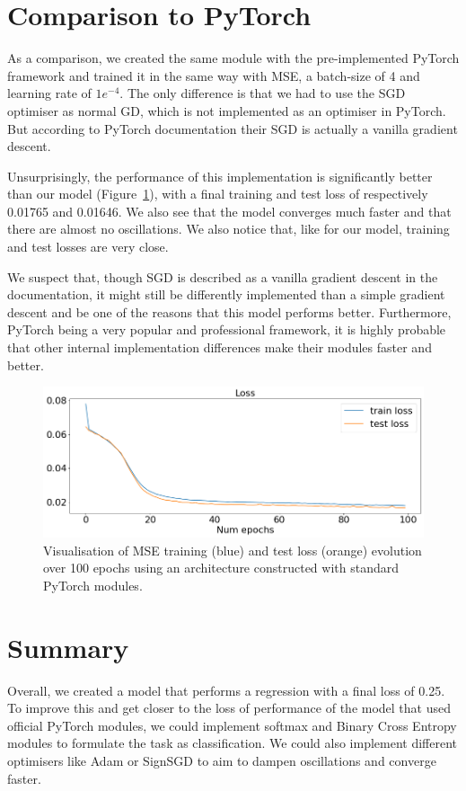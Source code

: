 \documentclass[10pt,conference,compsocconf]{IEEEtran}
\begin{document}
\section{Comparison to PyTorch}
As a comparison, we created the same module with the pre-implemented PyTorch framework and trained it in the same way with MSE, a batch-size of 4 and learning rate of $1e^{-4}$. The only difference is that we had to use the SGD optimiser as normal GD, which is not implemented as an optimiser in PyTorch. But according to PyTorch documentation their SGD is actually a vanilla gradient descent. 

Unsurprisingly, the performance of this implementation is significantly better than our model (Figure~\ref{fig:model-pytorch}), with a final training and test loss of respectively 0.01765 and 0.01646. We also see that the model converges much faster and that there are almost no oscillations. We also notice that, like for our model, training and test losses are very close. 

We suspect that, though SGD is described as a vanilla gradient descent in the documentation, it might still be differently implemented than a simple gradient descent and be one of the reasons that this model performs better. Furthermore, PyTorch being a very popular and professional framework, it is highly probable that other internal implementation differences make their modules faster and better. 

\label{sec:improved-models}
\begin{figure}[htbp]
  \centering
  \includegraphics[width=\columnwidth]{doc/project2-report/mse_preimpl.png}
  \vspace{-3mm}
  \caption{Visualisation of MSE training (blue) and test loss (orange) evolution over 100 epochs using an architecture constructed with standard PyTorch modules.}
  \label{fig:model-pytorch}
\end{figure}

\section{Summary}
Overall, we created a model that performs a regression with a final loss of 0.25. To improve this and get closer to the loss of performance of the model that used official PyTorch modules, we could implement softmax and Binary Cross Entropy modules to formulate the task as classification. We could also implement different optimisers like Adam or SignSGD to aim to dampen oscillations and converge faster.





\newpage

%
%
\end{document}
